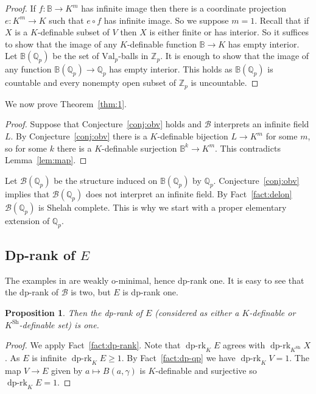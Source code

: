 \documentclass[bibalpha]{amsart}
\newcommand{\dprk}{\operatorname{dp-rk}}
\newtheorem{prop}[theorem]{Proposition}
\theoremstyle{definition}
\theoremstyle{remark}
\newcommand{\valp}{\mathrm{Val}_p}
\newcommand{\ksh}{K^{\mathrm{Sh}}}
\newcommand{\Sa}[1]{\ensuremath{\mathscr{#1}}}
\newcommand{\B}{\mathbb{B}}
\newcommand{\Z}{\mathbb{Z}}
\newcommand{\Q}{\mathbb{Q}}
\begin{document}
\begin{proof}
If $f : \B \to K^m$ has infinite image then there is a coordinate projection $e : K^m \to K$ such that $e \circ f$ has infinite image.
So we suppose $m = 1$.
Recall that if $X$ is a $K$-definable subset of $V$ then $X$ is either finite or has interior.
So it suffices to show that the image of any $K$-definable function $\B \to K$ has empty interior.
Let $\B(\Q_p)$ be the set of $\valp$-balls in $\Z_p$.
It is enough to show that the image of any function $\B(\Q_p) \to \Q_p$ has empty interior.
This holds as $\B(\Q_p)$ is countable and every nonempty open subset of $\Z_p$ is uncountable.
\end{proof}

\noindent
We now prove Theorem~\ref{thm:1}.

\begin{proof}
Suppose that Conjecture~\ref{conj:obv} holds and $\Sa B$ interprets an infinite field $L$.
By Conjecture~\ref{conj:obv} there is a $K$-definable bijection $L \to K^m$ for some $m$, so for some $k$ there is a $K$-definable surjection $\B^k \to K^m$.
This contradicts Lemma~\ref{lem:map}.
\end{proof}

\noindent
Let $\Sa B(\Q_p)$ be the structure induced on $\B(\Q_p)$ by $\Q_p$.
Conjecture~\ref{conj:obv} implies that $\Sa B(\Q_p)$ does not interpret an infinite field.
By Fact~\ref{fact:delon} $\Sa B(\Q_p)$ is Shelah complete.
This is why we start with a proper elementary extension of $\Q_p$.

\subsection{Dp-rank of $E$}
The examples in \cite{big-nip,field-in-Shelah} are weakly o-minimal, hence dp-rank one.
It is easy to see that the dp-rank of $\Sa B$ is two, but $E$ is dp-rank one.

\begin{prop}
\label{prop:dp-minimal}
Then the dp-rank of $E$ (considered as either a $K$-definable or $\ksh$-definable set) is one.
\end{prop}

\begin{proof}
We apply Fact~\ref{fact:dp-rank}.
Note that $\dprk_{K} E$ agrees with $\dprk_{\ksh} X$.
As $E$ is infinite $\dprk_{K} E \geq 1$.
By Fact~\ref{fact:dp-qp} we have $\dprk_{K} V = 1$. 
The map $V \to E$ given by $a \mapsto B(a,\gamma)$ is $K$-definable and surjective so $\dprk_K E = 1$.
\end{proof}
\end{document}
